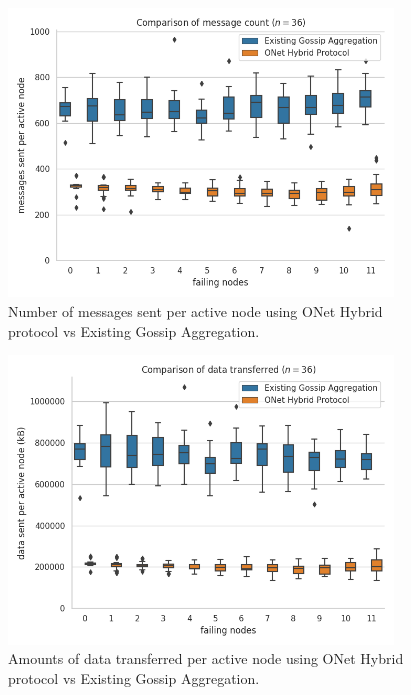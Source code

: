 \begin{figure}[H]
    \centering
    \includegraphics[width=0.91\textwidth]{images/bandwidth_msg_tx_sum_36.png}
    \caption{Number of messages sent per active node using ONet Hybrid protocol vs Existing Gossip Aggregation.}
    \label{fig2num}
\end{figure}

\begin{figure}[H]
    \centering
    \includegraphics[width=0.91\textwidth]{images/bandwidth_tx_sum_36.png}
    \caption{Amounts of data transferred per active node using ONet Hybrid protocol vs Existing Gossip Aggregation.}
    \label{fig2data}
\end{figure}


